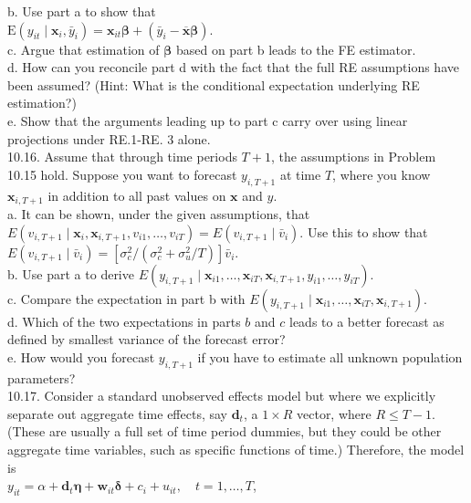 \documentclass[10pt]{article}
\begin{document}
b. Use part a to show that\\
$\mathrm{E}\left(y_{i t} \mid \mathbf{x}_{i}, \bar{y}_{i}\right)=\mathbf{x}_{i t} \boldsymbol{\beta}+\left(\bar{y}_{i}-\overline{\mathbf{x}} \boldsymbol{\beta}\right)$.\\
c. Argue that estimation of $\boldsymbol{\beta}$ based on part b leads to the FE estimator.\\
d. How can you reconcile part d with the fact that the full RE assumptions have been assumed? (Hint: What is the conditional expectation underlying RE estimation?)\\
e. Show that the arguments leading up to part c carry over using linear projections under RE.1-RE. 3 alone.\\
10.16. Assume that through time periods $T+1$, the assumptions in Problem 10.15 hold. Suppose you want to forecast $y_{i, T+1}$ at time $T$, where you know $\mathbf{x}_{i, T+1}$ in addition to all past values on $\mathbf{x}$ and $y$.\\
a. It can be shown, under the given assumptions, that $E\left(v_{i, T+1} \mid \mathbf{x}_{i}, \mathbf{x}_{i, T+1}, v_{i 1}, \ldots, v_{i T}\right) =E\left(v_{i, T+1} \mid \bar{v}_{i}\right)$. Use this to show that $E\left(v_{i, T+1} \mid \bar{v}_{i}\right)=\left[\sigma_{c}^{2} /\left(\sigma_{c}^{2}+\sigma_{u}^{2} / T\right)\right] \bar{v}_{i}$.\\
b. Use part a to derive $E\left(y_{i, T+1} \mid \mathbf{x}_{i 1}, \ldots, \mathbf{x}_{i T}, \mathbf{x}_{i, T+1}, y_{i 1}, \ldots, y_{i T}\right)$.\\
c. Compare the expectation in part b with $E\left(y_{i, T+1} \mid \mathbf{x}_{i 1}, \ldots, \mathbf{x}_{i T}, \mathbf{x}_{i, T+1}\right)$.\\
d. Which of the two expectations in parts $b$ and $c$ leads to a better forecast as defined by smallest variance of the forecast error?\\
e. How would you forecast $y_{i, T+1}$ if you have to estimate all unknown population parameters?\\
10.17. Consider a standard unobserved effects model but where we explicitly separate out aggregate time effects, say $\mathbf{d}_{t}$, a $1 \times R$ vector, where $R \leq T-1$. (These are usually a full set of time period dummies, but they could be other aggregate time variables, such as specific functions of time.) Therefore, the model is\\
$y_{i t}=\alpha+\mathbf{d}_{t} \boldsymbol{\eta}+\mathbf{w}_{i t} \boldsymbol{\delta}+c_{i}+u_{i t}, \quad t=1, \ldots, T$,\\
\end{document}
